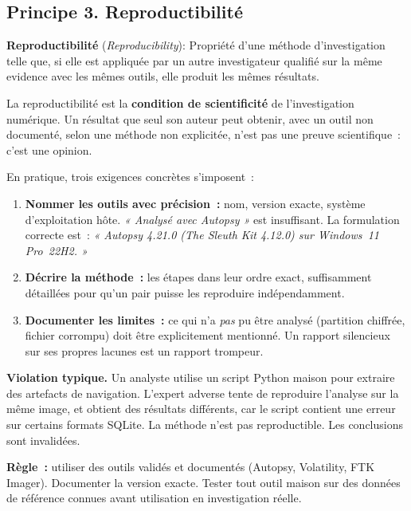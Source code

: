 \subsection{Principe 3. Reproductibilité}
\label{subsec:principe-reproductibilite}

\begin{boxdef}
\textbf{Reproductibilité} (\textit{Reproducibility}):
Propriété d'une méthode d'investigation telle que, si elle est appliquée
par un autre investigateur qualifié sur la même evidence avec les mêmes
outils, elle produit les mêmes résultats.
\end{boxdef}

La reproductibilité est la \textbf{condition de scientificité} de
l'investigation numérique. Un résultat que seul son auteur peut obtenir,
avec un outil non documenté, selon une méthode non explicitée, n'est pas
une preuve scientifique~: c'est une opinion.

En pratique, trois exigences concrètes s'imposent~:

\begin{enumerate}
    \item \textbf{Nommer les outils avec précision~:} nom, version exacte,
          système d'exploitation hôte. \textit{« Analysé avec Autopsy »}
          est insuffisant. La formulation correcte est~: \textit{« Autopsy
          4.21.0 (The Sleuth Kit 4.12.0) sur Windows~11 Pro~22H2. »}

    \item \textbf{Décrire la méthode~:} les étapes dans leur ordre exact,
          suffisamment détaillées pour qu'un pair puisse les reproduire
          indépendamment.

    \item \textbf{Documenter les limites~:} ce qui n'a \emph{pas} pu être
          analysé (partition chiffrée, fichier corrompu) doit être
          explicitement mentionné. Un rapport silencieux sur ses propres
          lacunes est un rapport trompeur.
\end{enumerate}

\begin{boxalert}
\textbf{Violation typique.} Un analyste utilise un script Python maison
pour extraire des artefacts de navigation. L'expert adverse tente de
reproduire l'analyse sur la même image, et obtient des résultats
différents, car le script contient une erreur sur certains formats SQLite.
La méthode n'est pas reproductible. Les conclusions sont invalidées.

\textbf{Règle~:} utiliser des outils validés et documentés (Autopsy,
Volatility, FTK Imager). Documenter la version exacte. Tester tout outil
maison sur des données de référence connues avant utilisation en investigation
réelle.
\end{boxalert}

